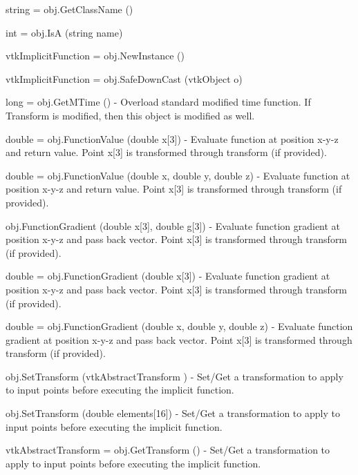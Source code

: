 \begin{DoxyItemize}
\item {\ttfamily string = obj.\-Get\-Class\-Name ()}  
\item {\ttfamily int = obj.\-Is\-A (string name)}  
\item {\ttfamily vtk\-Implicit\-Function = obj.\-New\-Instance ()}  
\item {\ttfamily vtk\-Implicit\-Function = obj.\-Safe\-Down\-Cast (vtk\-Object o)}  
\item {\ttfamily long = obj.\-Get\-M\-Time ()} -\/ Overload standard modified time function. If Transform is modified, then this object is modified as well.  
\item {\ttfamily double = obj.\-Function\-Value (double x\mbox{[}3\mbox{]})} -\/ Evaluate function at position x-\/y-\/z and return value. Point x\mbox{[}3\mbox{]} is transformed through transform (if provided).  
\item {\ttfamily double = obj.\-Function\-Value (double x, double y, double z)} -\/ Evaluate function at position x-\/y-\/z and return value. Point x\mbox{[}3\mbox{]} is transformed through transform (if provided).  
\item {\ttfamily obj.\-Function\-Gradient (double x\mbox{[}3\mbox{]}, double g\mbox{[}3\mbox{]})} -\/ Evaluate function gradient at position x-\/y-\/z and pass back vector. Point x\mbox{[}3\mbox{]} is transformed through transform (if provided).  
\item {\ttfamily double = obj.\-Function\-Gradient (double x\mbox{[}3\mbox{]})} -\/ Evaluate function gradient at position x-\/y-\/z and pass back vector. Point x\mbox{[}3\mbox{]} is transformed through transform (if provided).  
\item {\ttfamily double = obj.\-Function\-Gradient (double x, double y, double z)} -\/ Evaluate function gradient at position x-\/y-\/z and pass back vector. Point x\mbox{[}3\mbox{]} is transformed through transform (if provided).  
\item {\ttfamily obj.\-Set\-Transform (vtk\-Abstract\-Transform )} -\/ Set/\-Get a transformation to apply to input points before executing the implicit function.  
\item {\ttfamily obj.\-Set\-Transform (double elements\mbox{[}16\mbox{]})} -\/ Set/\-Get a transformation to apply to input points before executing the implicit function.  
\item {\ttfamily vtk\-Abstract\-Transform = obj.\-Get\-Transform ()} -\/ Set/\-Get a transformation to apply to input points before executing the implicit function.  

\end{DoxyItemize}
